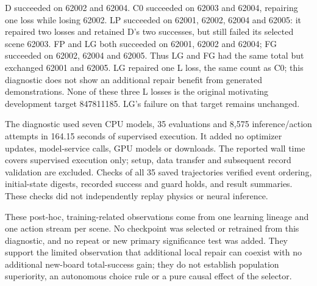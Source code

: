\documentclass[10pt,letterpaper]{article}
\begin{document}
D succeeded on 62002 and 62004. C0 succeeded on 62003 and 62004,
repairing one loss while losing 62002. LP succeeded on 62001, 62002,
62004 and 62005: it repaired two losses and retained D's two successes,
but still failed its selected scene 62003. FP and LG both succeeded on
62001, 62002 and 62004; FG succeeded on 62002, 62004 and 62005. Thus LG
and FG had the same total but exchanged 62001 and 62005. LG repaired one
L loss, the same count as C0; this diagnostic does not show an
additional repair benefit from generated demonstrations. None of these
three L losses is the original motivating development target 847811185.
LG's failure on that target remains unchanged.

The diagnostic used seven CPU models, 35 evaluations and 8,575
inference/action attempts in 164.15 seconds of supervised execution. It
added no optimizer updates, model-service calls, GPU models or
downloads. The reported wall time covers supervised execution only;
setup, data transfer and subsequent record validation are excluded.
Checks of all 35 saved trajectories verified event ordering,
initial-state digests, recorded success and guard holds, and result
summaries. These checks did not independently replay physics or neural
inference.

These post-hoc, training-related observations come from one learning
lineage and one action stream per scene. No checkpoint was selected or
retrained from this diagnostic, and no repeat or new primary
significance test was added. They support the limited observation that
additional local repair can coexist with no additional new-board
total-success gain; they do not establish population superiority, an
autonomous choice rule or a pure causal effect of the selector.


\end{document}
